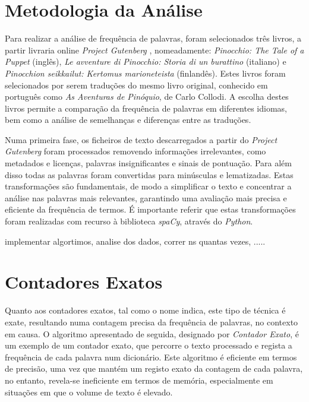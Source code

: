 \documentclass[mirror, portugues]{revdetua}
\begin{document}
\section{Metodologia da Análise}

Para realizar a análise de frequência de palavras, foram selecionados três livros, a partir livraria online \textit{Project Gutenberg} \cite{PG24}, nomeadamente: \textit{Pinocchio: The Tale of a Puppet} (inglês), \textit{Le avventure di Pinocchio: Storia di un burattino} (italiano) e \textit{Pinocchion seikkailut: Kertomus marioneteista} (finlandês). Estes livros foram selecionados por serem traduções do mesmo livro original, conhecido em português como \textit{As Aventuras de Pinóquio}, de Carlo Collodi. A escolha destes livros permite a comparação da frequência de palavras em diferentes idiomas, bem como a análise de semelhanças e diferenças entre as traduções.

Numa primeira fase, os ficheiros de texto descarregados a partir do \textit{Project Gutenberg} foram processados removendo informações irrelevantes, como metadados e licenças, palavras insignificantes e sinais de pontuação. Para além disso todas as palavras foram convertidas para minúsculas e lematizadas. Estas transformações são fundamentais, de modo a simplificar o texto e concentrar a análise nas palavras mais relevantes, garantindo uma avaliação mais precisa e eficiente da frequência de termos. É importante referir que estas transformações foram realizadas com recurso à biblioteca \textit{spaCy}, através do \textit{Python}.


implementar algortimos, analise dos dados, correr ns quantas vezes, .....


\section{Contadores Exatos}

Quanto aos contadores exatos, tal como o nome indica, este tipo de técnica é exate, resultando numa contagem precisa da frequência de palavras, no contexto em causa.
O algoritmo apresentado de seguida, designado por \textit{Contador Exato}, é um exemplo de um contador exato, que percorre o texto processado e regista a frequência de cada palavra num dicionário. Este algoritmo é eficiente em termos de precisão, uma vez que mantém um registo exato da contagem de cada palavra, no entanto, revela-se ineficiente em termos de memória, especialmente em situações em que o volume de texto é elevado.
\end{document}
